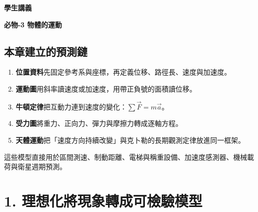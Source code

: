 \documentclass[11pt,a4paper]{article}
\providecommand{\tightlist}{%
  \setlength{\itemsep}{0pt}\setlength{\parskip}{0pt}}
\begin{document}
\begin{tcolorbox}[
  enhanced,colback=white,colframe=HandoutBlue,boxrule=1.1pt,arc=2mm,
  borderline west={3pt}{0pt}{HandoutBlue},left=5mm,right=4mm,top=4mm,bottom=4mm
]
{\sffamily\small\bfseries\color{HandoutBlue}學生講義}\par
{\sffamily\bfseries\LARGE\color{HandoutInk}必物-3 物體的運動}\par
\vspace{0.35em}{\large 從位置資料、受力圖到行星軌道的預測模型}\par
{}\par
{}\par
\end{tcolorbox}


\begin{HandoutLearningMap}

\subsection{本章建立的預測鏈}\label{ux672cux7ae0ux5efaux7acbux7684ux9810ux6e2cux93c8}

\begin{enumerate}
\def\labelenumi{\arabic{enumi}.}
\tightlist
\item
  \textbf{位置資料}先固定參考系與座標，再定義位移、路徑長、速度與加速度。
\item
  \textbf{運動圖}用斜率讀速度或加速度，用帶正負號的面積讀位移。
\item
  \textbf{牛頓定律}把互動力連到速度的變化：\(\sum\vec F=m\vec a\)。
\item
  \textbf{受力圖}將重力、正向力、彈力與摩擦力轉成逐軸方程。
\item
  \textbf{天體運動}把「速度方向持續改變」與克卜勒的長期觀測定律放進同一框架。
\end{enumerate}

這些模型直接用於區間測速、制動距離、電梯與稱重設備、加速度感測器、機械載荷與衛星週期預測。

\end{HandoutLearningMap}

\section{1. 理想化將現象轉成可檢驗模型}\label{ux7406ux60f3ux5316ux5c07ux73feux8c61ux8f49ux6210ux53efux6aa2ux9a57ux6a21ux578b}
\end{document}
